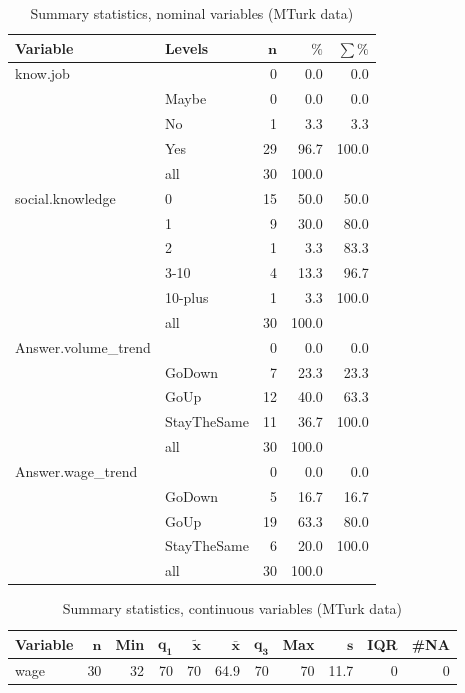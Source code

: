 \documentclass[a4paper,10pt]{article}\usepackage[]{graphicx}\usepackage[]{color}
\begin{document}
\begin{table}[ht]
\centering
{\footnotesize
\begin{tabular}{ll|rrr}
 \textbf{Variable} & \textbf{Levels} & $\mathbf{n}$ & $\mathbf{\%}$ & $\mathbf{\sum \%}$ \\ 
  \hline
know.job &  & 0 & 0.0 & 0.0 \\ 
   & Maybe & 0 & 0.0 & 0.0 \\ 
   & No & 1 & 3.3 & 3.3 \\ 
   & Yes & 29 & 96.7 & 100.0 \\ 
   \hline
 & all & 30 & 100.0 &  \\ 
   \hline
\hline
social.knowledge & 0 & 15 & 50.0 & 50.0 \\ 
   & 1 & 9 & 30.0 & 80.0 \\ 
   & 2 & 1 & 3.3 & 83.3 \\ 
   & 3-10 & 4 & 13.3 & 96.7 \\ 
   & 10-plus & 1 & 3.3 & 100.0 \\ 
   \hline
 & all & 30 & 100.0 &  \\ 
   \hline
\hline
Answer.volume\_trend &  & 0 & 0.0 & 0.0 \\ 
   & GoDown & 7 & 23.3 & 23.3 \\ 
   & GoUp & 12 & 40.0 & 63.3 \\ 
   & StayTheSame & 11 & 36.7 & 100.0 \\ 
   \hline
 & all & 30 & 100.0 &  \\ 
   \hline
\hline
Answer.wage\_trend &  & 0 & 0.0 & 0.0 \\ 
   & GoDown & 5 & 16.7 & 16.7 \\ 
   & GoUp & 19 & 63.3 & 80.0 \\ 
   & StayTheSame & 6 & 20.0 & 100.0 \\ 
   \hline
 & all & 30 & 100.0 &  \\ 
   \hline
\hline
\end{tabular}
}
\caption{Summary statistics, nominal variables (MTurk data)} 
\label{tab1:29-1060}
\end{table}
\begin{table}[ht]
\centering
{\footnotesize
\begin{tabular}{lrrrrrrrrrr}
 \textbf{Variable} & $\mathbf{n}$ & \textbf{Min} & $\mathbf{q_1}$ & $\mathbf{\widetilde{x}}$ & $\mathbf{\bar{x}}$ & $\mathbf{q_3}$ & \textbf{Max} & $\mathbf{s}$ & \textbf{IQR} & \textbf{\#NA} \\ 
  \hline
wage & 30 & 32 & 70 & 70 & 64.9 & 70 & 70 & 11.7 & 0 & 0 \\ 
  \end{tabular}
}
\caption{Summary statistics, continuous variables (MTurk data)} 
\label{tab2:29-1060}
\end{table}
\end{document}
